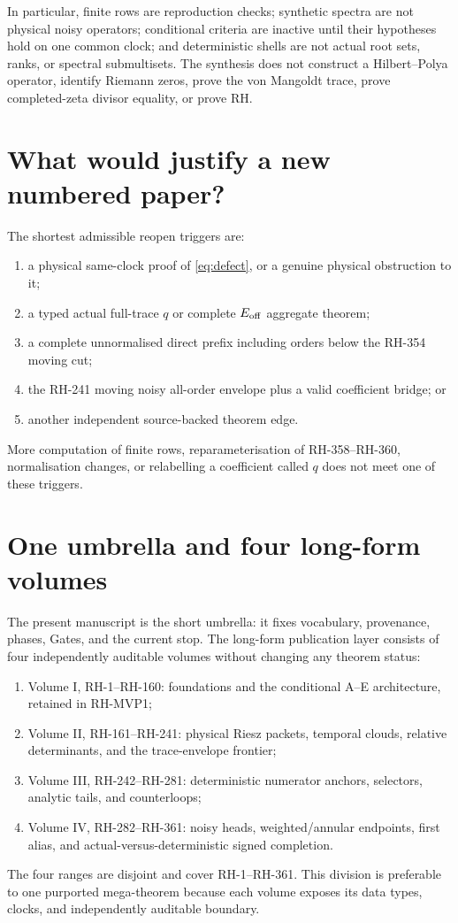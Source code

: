\documentclass[11pt]{article}
\theoremstyle{definition}
\theoremstyle{remark}
\newcommand{\Eoff}{E_{\rm off}}
\begin{document}
In particular, finite rows are reproduction checks; synthetic spectra are not
physical noisy operators; conditional criteria are inactive until their
hypotheses hold on one common clock; and deterministic shells are not actual
root sets, ranks, or spectral submultisets.  The synthesis does not construct
a Hilbert--Polya operator, identify Riemann zeros, prove the von Mangoldt
trace, prove completed-zeta divisor equality, or prove RH.

\section{What would justify a new numbered paper?}

The shortest admissible reopen triggers are:
\begin{enumerate}[leftmargin=2.2em]
\item a physical same-clock proof of \eqref{eq:defect}, or a genuine physical
 obstruction to it;
\item a typed actual full-trace $q$ or complete $\Eoff$ aggregate theorem;
\item a complete unnormalised direct prefix including orders below the
 RH-354 moving cut;
\item the RH-241 moving noisy all-order envelope plus a valid coefficient
 bridge; or
\item another independent source-backed theorem edge.
\end{enumerate}
More computation of finite rows, reparameterisation of RH-358--RH-360,
normalisation changes, or relabelling a coefficient called $q$ does not meet
one of these triggers.

\section{One umbrella and four long-form volumes}

The present manuscript is the short umbrella: it fixes vocabulary,
provenance, phases, Gates, and the current stop.  The long-form publication
layer consists of four independently auditable volumes without changing any
theorem status:
\begin{enumerate}[leftmargin=2.2em]
\item Volume I, RH-1--RH-160: foundations and the conditional A--E
 architecture, retained in RH-MVP1;
\item Volume II, RH-161--RH-241: physical Riesz packets, temporal clouds, relative
 determinants, and the trace-envelope frontier;
\item Volume III, RH-242--RH-281: deterministic numerator anchors, selectors, analytic
 tails, and counterloops;
\item Volume IV, RH-282--RH-361: noisy heads, weighted/annular endpoints, first alias,
 and actual-versus-deterministic signed completion.
\end{enumerate}
The four ranges are disjoint and cover RH-1--RH-361.  This division is
preferable to one purported mega-theorem because each volume exposes its data
types, clocks, and independently auditable boundary.
\end{document}
